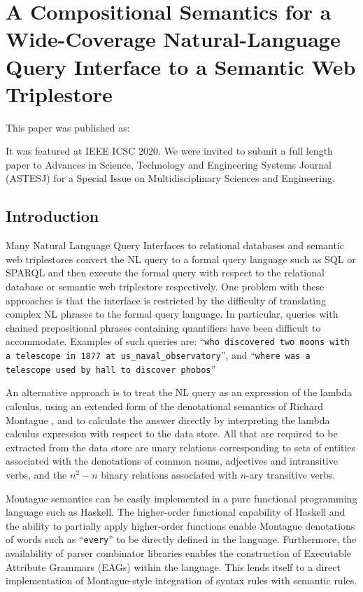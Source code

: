 \documentclass[../main.tex]{subfiles}
\begin{document}
\chapter{A Compositional Semantics for a Wide-Coverage Natural-Language Query Interface to a Semantic Web Triplestore}
\begin{refsection}

This paper was published as:


It was featured at IEEE ICSC 2020.  We were invited to submit a full length paper to Advances in Science, Technology and Engineering Systems Journal (ASTESJ) for a Special Issue on Multidisciplinary Sciences and Engineering.

\label{chapter:icsc2020conf}


\section{Introduction}

Many Natural Language Query Interfaces to relational databases and semantic web triplestores
convert the NL query to a formal query language such as SQL or SPARQL and then execute the formal
query with respect to the relational database or semantic web triplestore respectively. One problem with
these approaches is that the interface is restricted by the difficulty of translating complex NL phrases to
the formal query language. In particular, queries with chained prepositional phrases containing
quantifiers have been difficult to accommodate. Examples of such queries are: ``\texttt{who discovered two
moons with a telescope in 1877 at us\_naval\_observatory}'', and ``\texttt{where was a telescope used by hall to discover phobos}''

An alternative approach is to treat the NL query as an expression of the lambda calculus, using an
extended form of the denotational semantics of Richard Montague \cite{Dowty:wall}, and to calculate the answer directly
by interpreting the lambda calculus expression with respect to the data store. All that are required to be
extracted from the data store are unary relations corresponding to sets of entities associated with the
denotations of common nouns, adjectives and intransitive verbs, and the $n^2 - n$ binary relations
associated with $n$-ary transitive verbs.

Montague semantics can be easily implemented in a pure functional programming language such as
Haskell. The higher-order functional capability of Haskell and the ability to partially apply higher-order functions enable Montague denotations of words such as ``\texttt{every}'' to be directly defined in the language. Furthermore, the availability of
parser combinator libraries enables the construction of Executable Attribute Grammars (EAGs) within the language.
This lends itself to a direct implementation of Montague-style integration of syntax rules with semantic rules.


\end{refsection}
\end{document}
